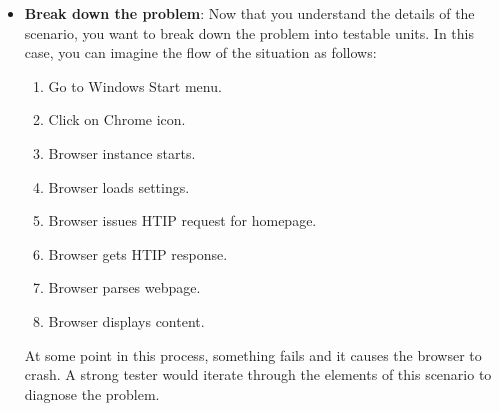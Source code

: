 \documentclass{report}
\begin{document}
\begin{itemize}
\begin{itemize}
\begin{itemize}
                        \item What version of the browser is it? What operating system?
                        \item Does the issue happen consistently, or how often does it happen? When does it happen?
                        \item Is there an error report that launches?
                    \end{itemize}
                \item \textbf{Break down the problem}: Now that you understand the details of the scenario, you want to break down the problem into testable units. In this case, you can imagine the flow of the situation as follows:
                    \begin{enumerate}
                        \item Go to Windows Start menu.
                        \item Click on Chrome icon.
                        \item Browser instance starts.
                        \item Browser loads settings.
                        \item Browser issues HTIP request for homepage.
                        \item Browser gets HTIP response.
                        \item Browser parses webpage.
                        \item Browser displays content.
                    \end{enumerate}
                    At some point in this process, something fails and it causes the browser to crash. A strong tester would iterate through the elements of this scenario to diagnose the problem.




            \end{itemize}




    \end{itemize}




    
\end{document}
